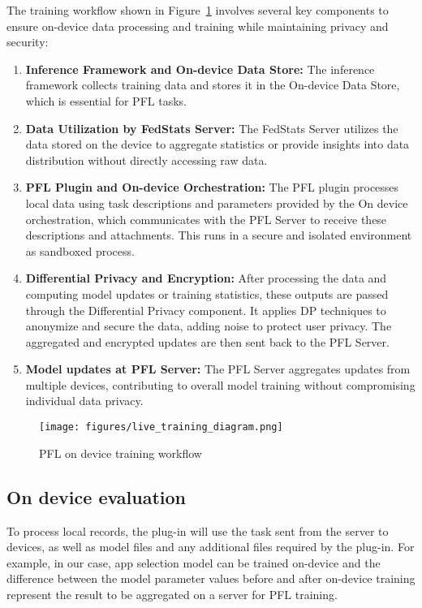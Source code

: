 The training workflow shown in Figure~\ref{fig 4} involves several key components to ensure on-device data processing and training while maintaining privacy and security:

\begin{enumerate}
    \item \textbf{Inference Framework and On-device Data Store:} The inference framework collects training data and stores it in the On-device Data Store, which is essential for PFL tasks.
    \item \textbf{Data Utilization by FedStats Server:} The FedStats Server utilizes the data stored on the device to aggregate statistics or provide insights into data distribution without directly accessing raw data.
    \item \textbf{PFL Plugin and On-device Orchestration:} The PFL plugin processes local data using task descriptions and parameters provided by the On device orchestration, which communicates with the PFL Server to receive these descriptions and attachments. This runs in a secure and isolated environment as sandboxed process.
    \item \textbf{Differential Privacy and Encryption:} After processing the data and computing model updates or training statistics, these outputs are passed through the Differential Privacy component. It applies DP techniques to anonymize and secure the data, adding noise to protect user privacy. The aggregated and encrypted updates are then sent back to the PFL Server.
    \item \textbf{Model updates at PFL Server:} The PFL Server aggregates updates from multiple devices, contributing to overall model training without compromising individual data privacy.
\end{enumerate}

\begin{figure}
\centering
\texttt{[image: figures/live\_training\_diagram.png]}
\caption{PFL on device training workflow}
\label{fig 4}
\end{figure}

\subsection{On device evaluation}

To process local records, the plug-in will use the task sent from the server to devices, as well as model files and any additional files required by the plug-in. For example, in our case, app selection model can be trained on-device and the difference between the model parameter values before and after on-device training represent the result to be aggregated on a server for PFL training. 

